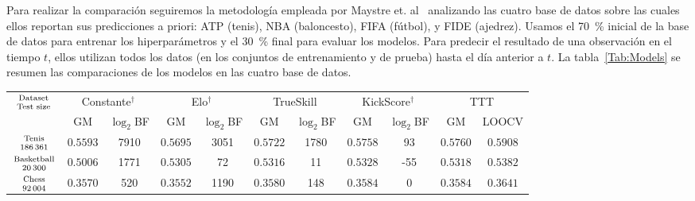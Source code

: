 \documentclass[a4paper,11pt]{book}
\newcommand\hfrac[2]{\genfrac{}{}{0pt}{}{#1}{#2}} %
\theoremstyle{definition}
\newif\ifen
\newcommand{\en}[1]{\ifen#1\fi}
\begin{document}
Para realizar la comparaci\'on seguiremos la metodolog\'ia empleada por Maystre et. al~\cite{Maystre2019} analizando las cuatro base de datos sobre las cuales ellos reportan sus predicciones a priori: ATP (tenis), NBA (baloncesto), FIFA (f\'utbol), y FIDE (ajedrez).
Usamos el \SI{70}{\percent} inicial de la base de datos para entrenar los hiperpar\'ametros y el \SI{30}{\percent} final para evaluar los modelos.
%
Para predecir el resultado de una observaci\'on en el tiempo $t$, ellos utilizan todos los datos (en los conjuntos de entrenamiento y de prueba) hasta el d\'ia anterior a $t$.
%
La tabla~\ref{Tab:Models} se resumen las comparaciones de los modelos en las cuatro base de datos.
%
\begin{table}[ht!] \centering
  \scriptsize
  \begin{tabular}{c|cc|cc|cc|cc|c||c}
 \multirow{2}{*}{$\hfrac{\text{\scriptsize Dataset}}{\text{Test size}}$} & \multicolumn{2}{c|}{Constante$^\dagger$}& \multicolumn{2}{c|}{Elo$^\dagger$} & \multicolumn{2}{c|}{TrueSkill} & \multicolumn{2}{c|}{KickScore$^\dagger$} &  \multicolumn{2}{c}{TTT} \\
 & GM & $\log_2$BF & GM & $\log_2$BF & GM & $\log_2$BF & GM & $\log_2$BF & GM & LOOCV \\ \hline
\multirow{2}{*}{$\hfrac{\text{\scriptsize Ten\en{n}is}}{\num{186361}}$} & \multirow{2}{*}{$0.5593$} & \multirow{2}{*}{\num{7910}} & \multirow{2}{*}{$0.5695$} & \multirow{2}{*}{\num{3051}} & \multirow{2}{*}{$0.5722$} & \multirow{2}{*}{\num{1780}} & \multirow{2}{*}{$0.5758$} & \multirow{2}{*}{\num{93}} & \multirow{2}{*}{$\bm{0.5760}$} & \multirow{2}{*}{${0.5908}$} \\
 & & & & & & & & & & \\
 \multirow{2}{*}{$\hfrac{\text{\scriptsize Basketball}}{\num{20300}}$} & \multirow{2}{*}{$0.5006$} & \multirow{2}{*}{\num{1771}} & \multirow{2}{*}{$0.5305$} & \multirow{2}{*}{\num{72}} & \multirow{2}{*}{$0.5316$} & \multirow{2}{*}{\num{11}} & \multirow{2}{*}{$\bm{0.5328}$} & \multirow{2}{*}{-55} & \multirow{2}{*}{${0.5318}$} & \multirow{2}{*}{${0.5382}$} \\
  & & & & & & & & & & \\
 \multirow{2}{*}{$\hfrac{\text{\scriptsize Chess}}{\num{92004}}$} & \multirow{2}{*}{$0.3570$} & \multirow{2}{*}{\num{520}} & \multirow{2}{*}{$0.3552$} & \multirow{2}{*}{\num{1190}} & \multirow{2}{*}{$0.3580$} & \multirow{2}{*}{\num{148}} & \multirow{2}{*}{$\bm{0.3584}$} & \multirow{2}{*}{0} & \multirow{2}{*}{$\bm{0.3584}$} & \multirow{2}{*}{${0.3641}$} \\

\end{tabular}
\end{table}
\end{document}
